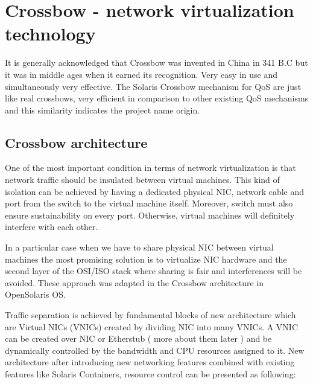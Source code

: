 \documentclass[11pt]{book}
\begin{document}
    \section{Crossbow - network virtualization technology}
    \label{sec:sol:xbow}


                It is generally acknowledged that Crossbow was invented in China in 341 B.C but it was in middle ages when 
                it earned its recognition. Very easy in use and simultaneously very effective. The Solaris Crossbow mechanism 
                for QoS are just like real crossbows, very efficient in comparison to other existing QoS mechanisms and this
                similarity indicates the project name origin.

                \subsection{Crossbow architecture}

                One of the most important condition in terms of network virtualization is that network traffic should be
                insulated between virtual machines. This kind of isolation can be achieved by having a dedicated
                physical NIC, network cable and port from the switch to the virtual machine itself. Moreover, switch
                must also ensure sustainability on every port. Otherwise, virtual machines will definitely
                interfere with each other.
                
                In a particular case when we have to share physical NIC
                between virtual machines the most promising solution is to virtualize NIC hardware and the second layer
                of the OSI/ISO stack where sharing is fair and interferences will be avoided. These approach was adapted
                in the Crossbow architecture in OpenSolaris OS.
                
                Traffic separation is achieved by
                fundamental blocks of new architecture which are Virtual NICs (VNICs) created by dividing NIC into many
                VNICs. A VNIC can be created over NIC or Etherstub ( more about them later ) and be
                dynamically controlled by the bandwidth and CPU resources assigned to it. New architecture after
                introducing new networking features combined with existing features like Solaris Containers, resource
                control can be presented as following:
\end{document}

